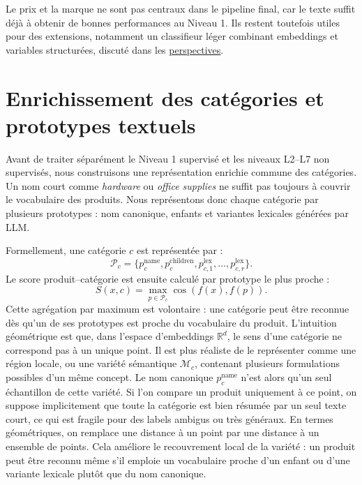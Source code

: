 \documentclass[12pt,a4paper]{report}
\begin{document}
Le prix et la marque ne sont pas centraux dans le pipeline final, car le texte suffit déjà à obtenir de bonnes performances au Niveau 1. Ils restent toutefois utiles pour des extensions, notamment un classifieur léger combinant embeddings et variables structurées, discuté dans les \hyperref[sec:conclusion-perspectives]{perspectives}.

\chapter{Enrichissement des catégories et prototypes textuels}
\label{chap:category-enrichment}

Avant de traiter séparément le Niveau 1 supervisé et les niveaux L2--L7 non supervisés, nous construisons une représentation enrichie commune des catégories. Un nom court comme \textit{hardware} ou \textit{office supplies} ne suffit pas toujours à couvrir le vocabulaire des produits. Nous représentons donc chaque catégorie par plusieurs prototypes : nom canonique, enfants et variantes lexicales générées par LLM.

Formellement, une catégorie $c$ est représentée par :
\begin{equation}
    \mathcal{P}_c =
    \{p_c^{\text{name}}, p_c^{\text{children}}, p_{c,1}^{\text{lex}}, \ldots, p_{c,r}^{\text{lex}}\}.
\end{equation}
Le score produit--catégorie est ensuite calculé par prototype le plus proche :
\begin{equation}
    S(x,c) = \max_{p \in \mathcal{P}_c} \cos\left(f(x), f(p)\right).
\end{equation}
Cette agrégation par maximum est volontaire : une catégorie peut être reconnue dès qu'un de ses prototypes est proche du vocabulaire du produit. L'intuition géométrique est que, dans l'espace d'embeddings $\mathbb{R}^d$, le sens d'une catégorie ne correspond pas à un unique point. Il est plus réaliste de le représenter comme une région locale, ou une variété sémantique $\mathcal{M}_c$, contenant plusieurs formulations possibles d'un même concept. Le nom canonique $p_c^{\text{name}}$ n'est alors qu'un seul échantillon de cette variété. Si l'on compare un produit uniquement à ce point, on suppose implicitement que toute la catégorie est bien résumée par un seul texte court, ce qui est fragile pour des labels ambigus ou très généraux.
En termes géométriques, on remplace une distance à un point par une distance à un ensemble de points. Cela améliore le recouvrement local de la variété : un produit peut être reconnu même s'il emploie un vocabulaire proche d'un enfant ou d'une variante lexicale plutôt que du nom canonique.
\end{document}
